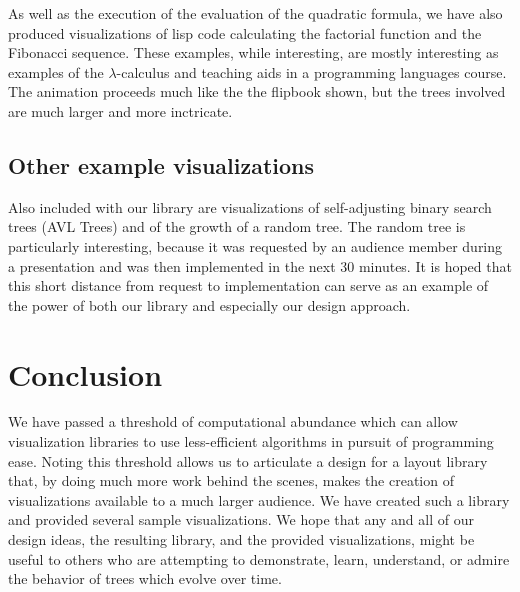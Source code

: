 \documentclass{article}
\begin{document}
As well as the execution of the evaluation of the quadratic formula, we have also produced visualizations of lisp code calculating the factorial function and the Fibonacci sequence.  These examples, while interesting, are mostly interesting as examples of the $\lambda$-calculus and teaching aids in a programming languages course.  The animation proceeds much like the the flipbook shown, but the trees involved are much larger and more inctricate.

\subsection{Other example visualizations}

Also included with our library are visualizations of self-adjusting binary search trees (AVL Trees) and of the growth of a random tree.  The random tree is particularly interesting, because it was requested by an audience member during a presentation and was then implemented in the next 30 minutes.  It is hoped that this short distance from request to implementation can serve as an example of the power of both our library and especially our design approach.

\section{Conclusion}

We have passed a threshold of computational abundance which can allow
visualization libraries to use less-efficient algorithms in pursuit of
programming ease.  Noting this threshold allows us to articulate a design for a
layout library that, by doing much more work behind the scenes, makes the
creation of visualizations available to a much larger audience.  We have
created such a library and provided several sample visualizations.  We hope
that any and all of our design ideas, the resulting library\cite{ourlibrary},
and the provided visualizations, might be useful to others who are attempting
to demonstrate, learn, understand, or admire the behavior of trees which evolve
over time.



\end{document}
